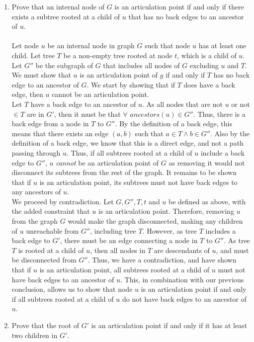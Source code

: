 \documentclass{article}
\begin{document}
\begin{enumerate}
\begin{enumerate}
	\item Prove that an internal node of $G$ is an articulation point if and only if there exists a subtree rooted at a child of $u$ that has no back edges to an ancestor of $u$.
	\\\\ Let node $u$ be an internal node in graph $G$ such that node $u$ has at least one child. Let tree $T$ be a non-empty tree rooted at node $t$, which is a child of $u$. Let $G''$ be the subgraph of $G$ that includes all nodes of $G$ excluding $u$ and $T$. We must show that $u$ is an articulation point of $g$ if and only if $T$ has no back edge to an ancestor of $G$. We start by showing that if $T$ does have a back edge, then $u$ cannot be an articulation point.
	\\ Let $T$ have a back edge to an ancestor of $u$. As all nodes that are not $u$ or not $\in T$ are in $G'$, then it must be that $\forall$ $ancestors(u) \in G''$. Thus, there is a back edge from a node in $T$ to $G''$. By the definition of a back edge, this means that there exists an edge $(a,b)$ such that $a \in T \land b \in G''$. Also by the definition of a back edge, we know that this is a direct edge, and not a path passing through $u$. Thus, if all subtrees rooted at a child of $u$ include a back edge to $G''$, $u$ \emph{cannot} be an articulation point of $G$ as removing it would not disconnect its subtrees from the rest of the graph. It remains to be shown that if $u$ is an articulation point, its subtrees must not have back edges to any ancestors of $u$.
	\\ We proceed by contradiction. Let $G, G'', T, t$ and $u$ be defined as above, with the added constraint that $u$ is an articulation point. Therefore, removing $u$ from the graph $G$ would make the graph disconnected, making any children of $u$ unreachable from $G''$, including tree $T$. However, as tree $T$ includes a back edge to $G'$, there must be an edge connecting a node in $T$ to $G''$. As tree $T$ is rooted at a child of $u$, then all nodes in $T$ are descendants of $u$, and must be disconnected from $G''$. Thus, we have a contradiction, and have shown that if $u$ is an articulation point, all subtrees rooted at a child of $u$ must not have back edges to an ancestor of $u$. This, in combination with our previous conclusion, allows us to show that node $u$ is an articulation point if and only if all subtrees rooted at a child of $u$ do not have back edges to an ancestor of $u$.
	\item Prove that the root of $G'$ is an articulation point if and only if it has at least two children in $G'$.

\end{enumerate}
\end{enumerate}
\end{document}
